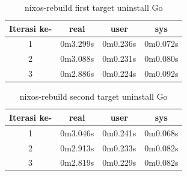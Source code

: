 \documentclass[10pt,]{report}
\begin{document}
\begin{adjustwidth}{20pt}{}
	\begin{table}[H]
		\caption{nixos-rebuild first target uninstall Go}
		\begin{center}
			\begin{tabular}[c]{|c|c|c|c|}
				\hline
				\multicolumn{1}{|c|}{\textbf{Iterasi ke-}} &
				\multicolumn{1}{c|}{\textbf{real}}         &
				\multicolumn{1}{c|}{\textbf{user}}         &
				\multicolumn{1}{c|}{\textbf{sys}}                                           \\
				\hline
				1                                          & 0m3.299s & 0m0.236s & 0m0.072s \\
				\hline
				2                                          & 0m3.088s & 0m0.231s & 0m0.080s \\
				\hline
				3                                          & 0m2.886s & 0m0.224s & 0m0.092s \\
				\hline
			\end{tabular}
		\end{center}
	\end{table}
	\vspace{-5mm}
	\begin{table}[H]
		\caption{nixos-rebuild second target uninstall Go}
		\begin{center}
			\begin{tabular}[c]{|c|c|c|c|}
				\hline
				\multicolumn{1}{|c|}{\textbf{Iterasi ke-}} &
				\multicolumn{1}{c|}{\textbf{real}}         &
				\multicolumn{1}{c|}{\textbf{user}}         &
				\multicolumn{1}{c|}{\textbf{sys}}                                           \\
				\hline
				1                                          & 0m3.046s & 0m0.241s & 0m0.068s \\
				\hline
				2                                          & 0m2.913s & 0m0.233s & 0m0.082s \\
				\hline
				3                                          & 0m2.819s & 0m0.229s & 0m0.082s \\
				\hline
			\end{tabular}
		\end{center}
	\end{table}

\end{adjustwidth}
\end{document}
